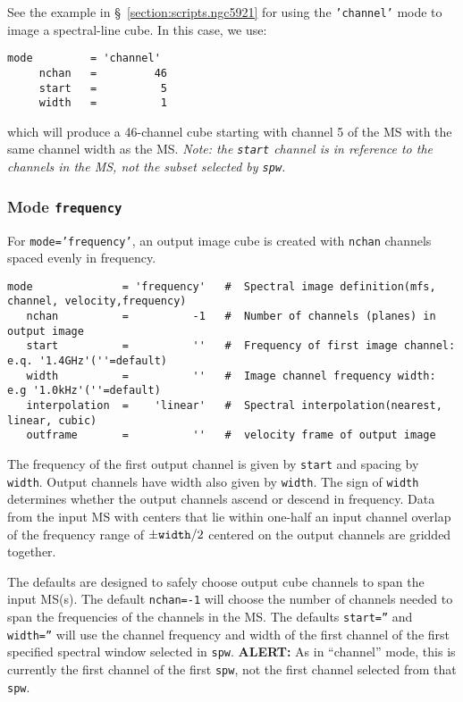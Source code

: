 See the example in \S~\ref{section:scripts.ngc5921} for using the {\tt 'channel'}
mode to image a spectral-line cube. In this case, we use:
\small
\begin{verbatim}
mode         = 'channel'       
     nchan   =         46   
     start   =          5   
     width   =          1   
\end{verbatim}
\normalsize
which will produce a 46-channel cube starting with channel 5 of the MS
with the same channel width as the MS.  {\em Note: the {\tt start}
channel is in reference to the channels in the MS, not the subset
selected by {\tt spw}.}

\subsubsection{Mode {\tt frequency} }
\label{section:im.pars.mode.frequency}

For {\tt mode='frequency'}, an output image cube is created
with {\tt nchan} channels spaced evenly in frequency.
\small
\begin{verbatim}
mode              = 'frequency'   #  Spectral image definition(mfs, channel, velocity,frequency)
   nchan          =          -1   #  Number of channels (planes) in output image
   start          =          ''   #  Frequency of first image channel: e.q. '1.4GHz'(''=default)
   width          =          ''   #  Image channel frequency width: e.g '1.0kHz'(''=default)
   interpolation  =    'linear'   #  Spectral interpolation(nearest, linear, cubic)
   outframe       =          ''   #  velocity frame of output image
\end{verbatim}
\normalsize
The frequency of the first output channel is given by {\tt start}
and spacing by {\tt width}.  Output channels have width also given by {\tt width}.
The sign of {\tt width}
determines whether the output channels ascend or descend in
frequency.  Data from the input MS with centers that lie within one-half an input
channel overlap of the frequency range of $\pm{\tt width}/2$ centered
on the output channels are gridded together.  

The defaults are designed to safely choose output cube channels to
span the input MS(s).
The default {\tt nchan=-1} will choose the number of channels needed
to span the frequencies of the channels in the MS.  
The defaults {\tt start=''} and {\tt width=''} will use the channel
frequency and width of the first channel of the first specified
spectral window selected in {\tt spw}.  {\bf ALERT:} As in ``channel''
mode, this is currently the first channel of the first {\tt spw}, not
the first channel selected from that {\tt spw}.  

